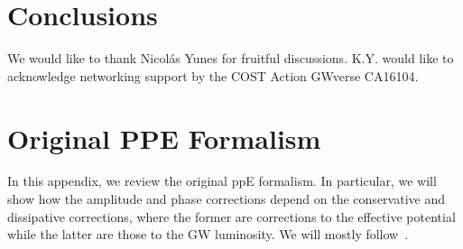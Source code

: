 \documentclass[prd,twocolumn,nofootinbib]{revtex4-1}
\begin{document}
\begin{comment}
\hline
 \vspace{20pt}
 \tiny NC&\rule{0pt}{4ex}\tiny${-\frac{75 (2 \eta -1) \Lambda ^2}{256 \eta ^{4/5}}}$&\tiny-1&\tiny$\bm{-\frac{3 (2 \eta -1) \Lambda ^2}{8 \eta ^{4/5}}}$&\tiny4\\
 \hline
  \vspace{20pt}
\tiny Einstein-$\AE$ther&\rule{0pt}{4ex}\tiny$\bm{-\frac{5 \eta ^{2/5} \left(s_1-s_2\right){}^2 \left(\left(c_{14}-2\right) w_0^3-w_1^3\right)}{3584 c_{14} w_0^3 w_1^3 \left(\text{$G_N$} \left(s_1-1\right) \left(s_2-1\right)\right){}^{4/3}}}$&\tiny-7&\tiny$\bm{-\frac{5 \eta ^{2/5} \left(s_1-s_2\right){}^2 \left(\left(c_{14}-2\right) w_0^3-w_1^3\right)}{96 c_{14} w_0^3 w_1^3 \left(\text{$G_N$} \left(s_1-1\right) \left(s_2-1\right)\right){}^{4/3}}}$&\tiny-2\\

 \hline
 \vspace{20pt}
 \tiny Varying-G Theory&\rule{0pt}{4ex}\tiny $\bm{-\frac{75 m_0 {\eta_0}^{3/5}}{851968 {G_0}^{10/3}} \bigg(\frac{11 \dot{G}}{3 G_0} + \frac{17 \dot{M}}{3M_0}-\frac{m_{1,0}\dot{m_2}+m_{2,0}\dot{m_1}}{{m_0}^2 \eta0}\bigg)}$&\tiny-13&\tiny$\bm{\frac{-5 m_0 {\eta_0}^{3/5}}{512 {G_0}^{5/3}} \bigg(\frac{7 \dot{G}}{ G_0} + \frac{5\dot{M}}{m_0}+\frac{m_{1,0}\dot{m_2}+m_{2,0}\dot{m_1}}{{m_0}^2 \eta0}\bigg)}$&\tiny-8\\
\hline
\end{tabular}
\end{comment}

\section{Conclusions}
\label{sec:conclusions}

\acknowledgments
We would like to thank Nicol\' as Yunes for fruitful discussions.
K.Y. would like to acknowledge networking support by the COST Action GWverse CA16104.

 \appendix 
 
 \section{Original PPE Formalism}
 \label{appendix}

In this appendix, we review the original ppE formalism. In particular, we will show how the amplitude and phase corrections depend on the conservative and dissipative corrections, where the former are corrections to the effective potential while the latter are those to the GW luminosity. We will mostly follow~\cite{Chatziioannou:2012rf}.
\end{document}
